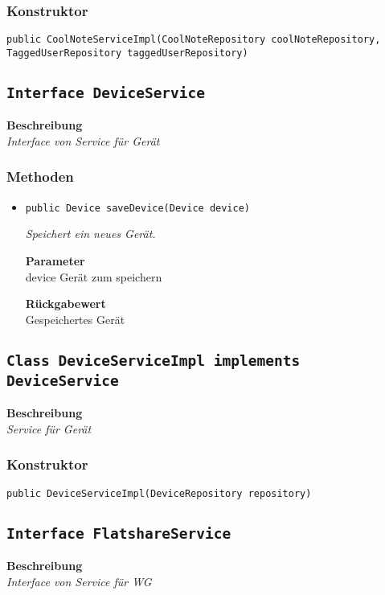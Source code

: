     \subsubsection*{Konstruktor}
    \texttt{public CoolNoteServiceImpl(CoolNoteRepository coolNoteRepository, TaggedUserRepository taggedUserRepository)}
    \subsection{\texttt{Interface DeviceService}}
    \textbf{Beschreibung} \\
    \textit{Interface von Service für Gerät}
    \subsubsection*{Methoden}
    \begin{itemize}
    	\item{\texttt{public Device saveDevice(Device device)}}
    	
    	\textit{Speichert ein neues Gerät.}
    	
    	\textbf{Parameter} \\
    	device Gerät zum speichern
    	
    	\textbf{Rückgabewert} \\
    	Gespeichertes Gerät
    \end{itemize}
    \subsection{\texttt{Class DeviceServiceImpl implements DeviceService}}
    \textbf{Beschreibung} \\
    \textit{Service für Gerät}
    \subsubsection*{Konstruktor}
    \texttt{public DeviceServiceImpl(DeviceRepository repository)}
    \subsection{\texttt{Interface FlatshareService}}
    \textbf{Beschreibung} \\
    \textit{Interface von Service für WG}
